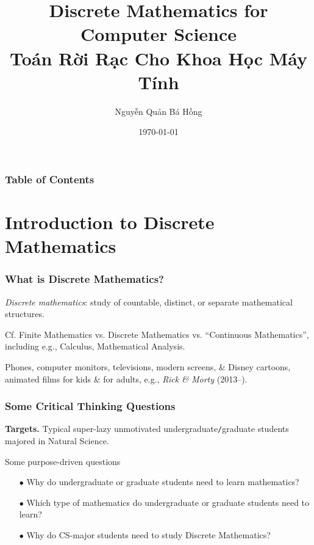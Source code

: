 \documentclass{beamer}
\title{Discrete Mathematics for Computer Science\\Toán Rời Rạc Cho Khoa Học Máy Tính}
\author{Nguyễn Quản Bá Hồng}
\institute{Presented at UMT -- University of Management \& Technology of HCMC}
\date{\today}
\begin{document}
\frame{\titlepage}
\begin{frame}
	\frametitle{Table of Contents}
	\tableofcontents
\end{frame}

\section{Introduction to Discrete Mathematics}

\begin{frame}
	\frametitle{What is Discrete Mathematics?}
	
	\begin{definition}
		\emph{Discrete mathematics}: study of countable, distinct, or separate mathematical structures.
	\end{definition}
	Cf. Finite Mathematics vs. Discrete Mathematics vs. ``Continuous Mathematics'', including e.g., Calculus, Mathematical Analysis.
	
	\begin{example}[Pixel]
		Phones, computer monitors, televisions, modern screens, \& Disney cartoons, animated films for kids \& for adults, e.g., {\it Rick \& Morty} (2013--).
	\end{example}
	
\end{frame}

\begin{frame}
	\frametitle{Some Critical Thinking Questions}
	{\bf Targets.} Typical super-lazy unmotivated undergraduate{\tt/}graduate students majored in Natural Science.
	\begin{block}{Some purpose-driven questions}
		\begin{itemize}\it
			\item[$\bullet$] Why do undergraduate or graduate students need to learn mathematics?
			\item[$\bullet$] Which type of mathematics do undergraduate or graduate students need to learn?
			\item[$\bullet$] Why do CS-major students need to study Discrete Mathematics?
		\end{itemize}
	\end{block}
\end{frame}
\end{document}
